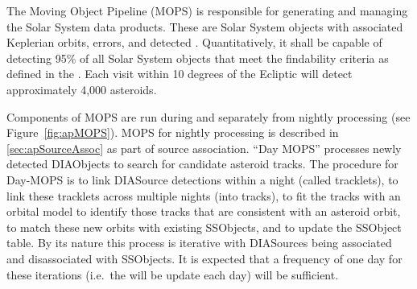 The Moving Object Pipeline (MOPS) is responsible for generating and managing the Solar System data products. These are Solar System objects with associated Keplerian orbits, errors, and detected \DIASources. Quantitatively, it shall be capable of detecting 95\% of all Solar System objects that meet the findability criteria as defined in the \OSS\@. Each visit within 10 degrees of the Ecliptic will detect approximately 4,000 asteroids.

Components of MOPS are run during and separately from nightly processing (see Figure~\ref{fig:apMOPS}). MOPS for nightly processing is described in \ref{sec:apSourceAssoc} as part of source association. ``Day MOPS'' processes newly detected DIAObjects to search for candidate asteroid tracks. The procedure for Day-MOPS is to link DIASource detections within a night (called tracklets), to link these tracklets across multiple nights (into tracks), to fit the tracks with an orbital model to identify those tracks that are consistent with an asteroid orbit, to match these new orbits with existing SSObjects, and to update the SSObject table. By its nature this process is iterative with DIASources being associated and disassociated with SSObjects. It is expected that a frequency of one day for these iterations (i.e.\ the \SSObjects will be update each day) will be sufficient. 

